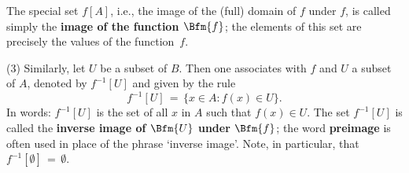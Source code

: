         The special set $f[A]$, i.e., the image of the (full) domain of $f$ under $f$,
    is called simply the {\bf image of the function $\Bfm{f}$};
    the elements of this set are precisely the values of the function~$f$.

\V

        (3) Similarly, let $U$ be a subset of $B$.
    Then one associates with $f$ and $U$ a subset of $A$, denoted by $f^{-1}[U]$ and given by the rule
        \begin{displaymath}
        f^{-1}[U] \,=\, \{x{\in}A: f(x){\in}U\}.
        \end{displaymath}
    In words: $f^{-1}[U]$ is the set of all $x$ in $A$ such that $f(x){\in}U$. 
The set $f^{-1}[U]$ is called the {\bf inverse image of $\Bfm{U}$
    under $\Bfm{f}$};
the word {\bf preimage} is often used in place of the phrase `inverse image'.
    Note, in particular, that $f^{-1}[{\emptyset}] \,=\, {\emptyset}$.

\V
\V

